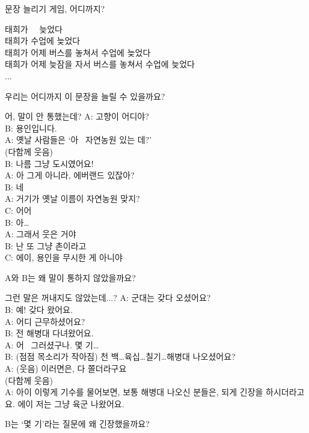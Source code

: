 \documentclass[11pt, aspectratio=169]{beamer}
\begin{document}
\begin{frame}[t]{}
  \begin{block}{문장 늘리기 게임, 어디까지?}
    \begin{center}
      태희가 \,\,\,\, 늦었다 \\
      태희가 수업에 늦었다 \\
      태희가 어제 버스를 놓쳐서 수업에 늦었다 \\
      태희가 어제 늦잠을 자서 버스를 놓쳐서 수업에 늦었다 \\
      ...
    \end{center}
  \end{block}
  우리는 어디까지 이 문장을 늘릴 수 있을까요?
\end{frame}

\begin{frame}[t]{}
  \begin{block}{어, 말이 안 통했는데?}
    A: 고향이 어디야? \\
    B: 용인입니다.\\
    A: 옛날 사람들은 ‘아~ 자연농원 있는 데?’\\
    (다함께 웃음)\\
    B: 나름 그냥 도시였어요!\\
    A: 아 그게 아니라, 에버랜드 있잖아?\\
    B: 네\\
    A: 거기가 옛날 이름이 자연농원 맞지?\\
    C: 어어\\
    B: 아\dots\\
    A: 그래서 웃은 거야\\
    B: 난 또 그냥 촌이라고~\\
    C: 에이, 용인을 무시한 게 아니야~ 
  \end{block}
  A와 B는 왜 말이 통하지 않았을까요?
\end{frame}

\begin{frame}[t]{}
  \begin{block}{그런 말은 꺼내지도 않았는데...?}
    A: 군대는 갖다 오셨어요?\\
    B: 예! 갖다 왔어요.\\
    A: 어디 근무하셨어요?\\
    B: 전 해병대 다녀왔어요.\\
    A: 어~ 그러셨구나. 몇 기\dots\\
    B: (점점 목소리가 작아짐) 천 백\dots 육십\dots 칠기\dots 해병대 나오셨어요?\\
    A: (웃음) 이러면은, 다 쫄더라구요\\
    (다함께 웃음)\\
    A: 아이 이렇게 기수를 물어보면, 보통 해병대 나오신 분들은, 되게 긴장을 하시더라고요. 에이 저는 그냥 육군 나왔어요.
  \end{block}
  B는 ‘몇 기’라는 질문에 왜 긴장했을까요?
\end{frame}
\end{document}
